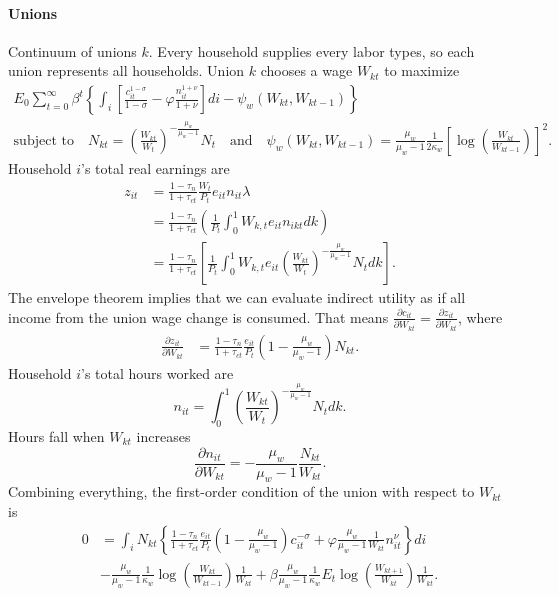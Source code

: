 \documentclass[11pt,a4paper]{article}
\begin{document}
\paragraph{Unions}
Continuum of unions $k$. Every household supplies every labor types, so each union represents all households. Union $k$ chooses a wage $W_{kt}$ to maximize
\begin{equation*}
\begin{gathered}
E_0\sum_{t=0}^{\infty}\beta^t\left\{\int_i\left[\frac{c_{it}^{1-\sigma}}{1-\sigma}-\varphi\frac{n_{it}^{1+\nu}}{1+\nu}\right]di-\psi_w(W_{kt},W_{kt-1})\right\}\\
\text{subject to}\quad N_{kt}=\left(\frac{W_{kt}}{W_t}\right)^{-\frac{\mu_w}{\mu_w-1}}N_t\quad\text{and}\quad\psi_w(W_{kt},W_{kt-1})=\frac{\mu_w}{\mu_w-1}\frac{1}{2\kappa_w}\left[\log\left(\frac{W_{kt}}{W_{kt-1}}\right)\right]^2.
\end{gathered}
\end{equation*}
Household $i$'s total real earnings are
\begin{align*}
z_{it}&=\frac{1-\tau_n}{1+\tau_{ct}}\frac{W_{t}}{P_t}e_{it}n_{it}\lambda\\
&=\frac{1-\tau_n}{1+\tau_{ct}}\left(\frac{1}{P_t}\int_0^1W_{k,t}e_{it}n_{ikt}dk\right)\\
&=\frac{1-\tau_n}{1+\tau_{ct}}\left[\frac{1}{P_t}\int_0^1W_{k,t}e_{it}\left(\frac{W_{kt}}{W_t}\right)^{-\frac{\mu_w}{\mu_w-1}}N_tdk\right].
\end{align*}
The envelope theorem implies that we can evaluate indirect utility as if all income from the union wage change is consumed. That means $\frac{\partial c_{it}}{\partial W_{kt}}=\frac{\partial z_{it}}{\partial W_{kt}}$, where
\begin{align*}
\frac{\partial z_{it}}{\partial W_{kt}}&=\frac{1-\tau_n}{1+\tau_{ct}}\frac{e_{it}}{P_t}\left(1-\frac{\mu_w}{\mu_w-1}\right)N_{kt}.
\end{align*}
Household $i$'s total hours worked are
\begin{equation*}
n_{it}=\int_0^1\left(\frac{W_{kt}}{W_t}\right)^{-\frac{\mu_w}{\mu_w-1}}N_tdk.
\end{equation*}
Hours fall when $W_{kt}$ increases 
\begin{equation*}
\frac{\partial n_{it}}{\partial W_{kt}}=-\frac{\mu_w}{\mu_w-1}\frac{N_{kt}}{W_{kt}}.
\end{equation*}
Combining everything, the first-order condition of the union with respect to $W_{kt}$ is
\begin{equation*}
\begin{split}
0&=\int_i N_{kt}\left\{\frac{1-\tau_n}{1+\tau_{ct}}\frac{e_{it}}{P_t}\left(1-\frac{\mu_w}{\mu_w-1}\right)c_{it}^{-\sigma}+\varphi\frac{\mu_w}{\mu_w-1}\frac{1}{W_{kt}}n_{it}^{\nu}\right\}di\\
&-\frac{\mu_w}{\mu_w-1}\frac{1}{\kappa_w}\log\left(\frac{W_{kt}}{W_{kt-1}}\right)\frac{1}{W_{kt}}+\beta\frac{\mu_w}{\mu_w-1}\frac{1}{\kappa_w}E_t\log\left(\frac{W_{kt+1}}{W_{kt}}\right)\frac{1}{W_{kt}}.
\end{split}
\end{equation*}
\end{document}
